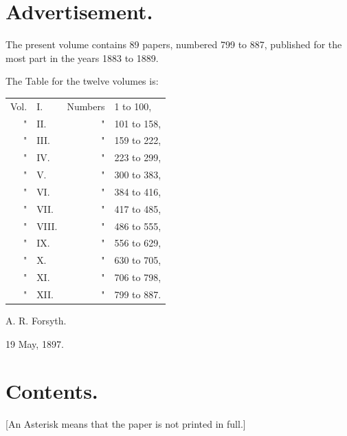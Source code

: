 \documentclass[11pt,a4paper]{book}
\begin{document}
\section*{Advertisement.}

The present volume contains 89 papers, numbered 799 to 887, published for the most part in the years 1883 to 1889.

The Table for the twelve volumes is:
\begin{center}
\begin{tabular}{r@{ }l@{ }r@{ }l}
Vol. & I. & Numbers & 1 to 100,\\
" & II. & " & 101 to 158,\\
" & III. & " & 159 to 222,\\
" & IV. & " & 223 to 299,\\
" & V. & " & 300 to 383,\\
" & VI. & " & 384 to 416,\\
" & VII. & " & 417 to 485,\\
" & VIII. & " & 486 to 555,\\
" & IX. & " & 556 to 629,\\
" & X. & " & 630 to 705,\\
" & XI. & " & 706 to 798,\\
" & XII. & " & 799 to 887.
\end{tabular}
\end{center}

\hfill A. R. Forsyth.

\hfill 19 May, 1897.
\cleardoublepage

\section*{Contents.}

[An Asterisk means that the paper is not printed in full.]

\bigskip
\end{document}
